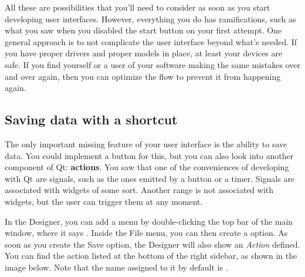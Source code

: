 All these are possibilities that you'll need to consider as soon as you start developing user interfaces. However, everything you do has ramifications, such as what you saw when you disabled the start button on your first attempt. One general approach is to not complicate the user interface beyond what's needed. If you have proper drivers and proper models in place, at least your devices are safe. If you find yourself or a user of your software making the same mistakes over and over again, then you can optimize the flow to prevent it from happening again.

\subsection{Saving data with a shortcut}\label{subsec:saving-data-with-a-shortcut}
The only important missing feature of your user interface is the ability to save data. You could implement a button for this, but you can also look into another component of Qt: \textbf{actions}. You saw that one of the conveniences of developing with Qt are signals, such as the ones emitted by a button or a timer. Signals are associated with widgets of some sort. Another range is not associated with widgets, but the user can trigger them at any moment.

In the Designer, you can add a  menu by double-clicking the top bar of the main window, where it says . Inside the File menu, you can then create a  option. As soon as you create the Save option, the Designer will also show an \emph{Action} defined. You can find the action listed at the bottom of the right sidebar, as shown in the image below. Note that the name assigned to it by default is .

